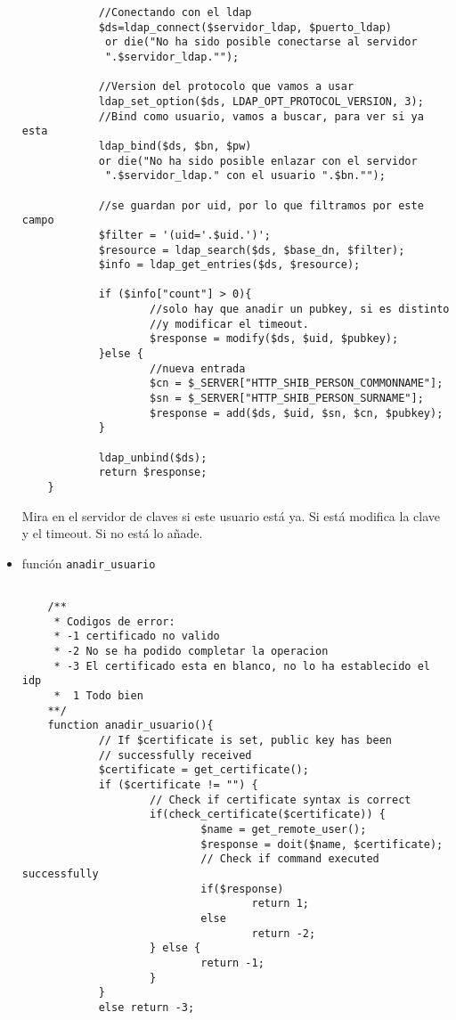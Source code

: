 \begin{itemize}
\begin{lstlisting}
            //Conectando con el ldap
            $ds=ldap_connect($servidor_ldap, $puerto_ldap)
             or die("No ha sido posible conectarse al servidor
             ".$servidor_ldap."");
            
            //Version del protocolo que vamos a usar
            ldap_set_option($ds, LDAP_OPT_PROTOCOL_VERSION, 3);
            //Bind como usuario, vamos a buscar, para ver si ya esta
            ldap_bind($ds, $bn, $pw) 
            or die("No ha sido posible enlazar con el servidor
             ".$servidor_ldap." con el usuario ".$bn."");

            //se guardan por uid, por lo que filtramos por este campo
            $filter = '(uid='.$uid.')';
            $resource = ldap_search($ds, $base_dn, $filter);
            $info = ldap_get_entries($ds, $resource);

            if ($info["count"] > 0){
                    //solo hay que anadir un pubkey, si es distinto
                    //y modificar el timeout.
                    $response = modify($ds, $uid, $pubkey);
            }else {
                    //nueva entrada
                    $cn = $_SERVER["HTTP_SHIB_PERSON_COMMONNAME"];
                    $sn = $_SERVER["HTTP_SHIB_PERSON_SURNAME"];
                    $response = add($ds, $uid, $sn, $cn, $pubkey);
            }

            ldap_unbind($ds);
            return $response;
    }
    \end{lstlisting}


     Mira en el servidor de claves si este usuario está ya. Si está
     modifica la clave y el timeout. Si no está lo añade.

    \item función \texttt{anadir\_usuario}
    \begin{lstlisting}

    /**
     * Codigos de error:
     * -1 certificado no valido
     * -2 No se ha podido completar la operacion
     * -3 El certificado esta en blanco, no lo ha establecido el idp
     *  1 Todo bien 
    **/
    function anadir_usuario(){
            // If $certificate is set, public key has been 
            // successfully received
            $certificate = get_certificate();
            if ($certificate != "") {
                    // Check if certificate syntax is correct
                    if(check_certificate($certificate)) {
                            $name = get_remote_user();
                            $response = doit($name, $certificate);
                            // Check if command executed successfully
                            if($response)
                                    return 1;
                            else 
                                    return -2;
                    } else {
                            return -1;
                    }
            }
            else return -3;
    

\end{lstlisting}
\end{itemize}
